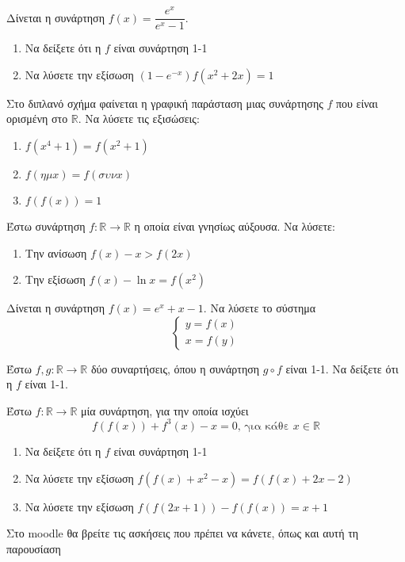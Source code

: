 \documentclass{presentation}
\begin{document}
\begin{askisi}
  Δίνεται η συνάρτηση $f(x)=\dfrac{e^x}{e^x-1}$.
  \begin{enumerate}[<+-|alert@+>]
    \item Να δείξετε ότι η $f$ είναι συνάρτηση 1-1
    \item Να λύσετε την εξίσωση $(1-e^{-x})f(x^2+2x)=1$
  \end{enumerate}
\end{askisi}

\begin{askisi}
  Στο διπλανό σχήμα φαίνεται η γραφική παράσταση μιας συνάρτησης $f$ που είναι ορισμένη στο $\mathbb{R}$. Να λύσετε τις εξισώσεις:
  \begin{enumerate}[<+-|alert@+>]
    \item $f(x^4+1)=f(x^2+1)$
    \item $f(ημ x)=f(συν x)$
    \item $f\left( f(x) \right)=1$
  \end{enumerate}
\end{askisi}

\begin{askisi}
  Έστω συνάρτηση $f:\mathbb{R}\to \mathbb{R}$ η οποία είναι γνησίως αύξουσα. Να λύσετε:
  \begin{enumerate}[<+-|alert@+>]
    \item Την ανίσωση $f(x)-x>f(2x)$
    \item Την εξίσωση $f(x)-\ln x=f(x^2)$
  \end{enumerate}
\end{askisi}

\begin{askisi}
  Δίνεται η συνάρτηση $f(x)=e^x+x-1$. Να λύσετε το σύστημα
  $$\begin{cases}
      y=f(x) \\
      x=f(y)
    \end{cases}$$
\end{askisi}

\begin{askisi}
  Έστω $f,g:\mathbb{R}\to\mathbb{R}$ δύο συναρτήσεις, όπου η συνάρτηση $g\circ f$ είναι 1-1. Να δείξετε ότι η $f$ είναι 1-1.
\end{askisi}

\begin{askisi}
  Έστω $f:\mathbb{R}\to\mathbb{R}$ μία συνάρτηση, για την οποία ισχύει
  $$f\left(f(x)\right)+f^3(x)-x=0\text{, για κάθε }x\in\mathbb{R}$$
  \begin{enumerate}[<+-|alert@+>]
    \item Να δείξετε ότι η $f$ είναι συνάρτηση 1-1
    \item Να λύσετε την εξίσωση $f\left(f(x)+x^2-x\right)=f\left(f(x)+2x-2\right)$
    \item Να λύσετε την εξίσωση $f\left(f(2x+1)\right)-f\left(f(x)\right)=x+1$
  \end{enumerate}
\end{askisi}

\begin{frame}
  Στο moodle θα βρείτε τις ασκήσεις που πρέπει να κάνετε, όπως και αυτή τη παρουσίαση
\end{frame}
\end{document}
